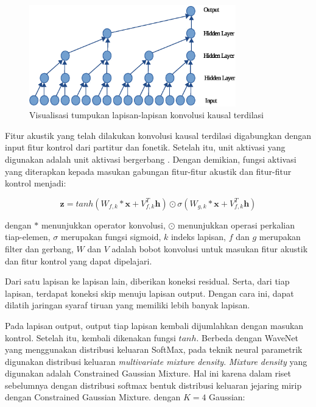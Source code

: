 \begin{figure}[h]
    \centering
    \includegraphics[width=0.8\textwidth]{resources/dilated-cnn.eps}
    \caption{Visualisasi tumpukan lapisan-lapisan konvolusi kausal terdilasi \parencite{Oord2016WaveNetAG}}\label{fig-dilated-cnn}
\end{figure}

Fitur akustik yang telah dilakukan konvolusi kausal terdilasi digabungkan dengan input fitur kontrol dari partitur dan fonetik. Setelah itu, unit aktivasi yang digunakan adalah unit aktivasi bergerbang \parencite{Oord2016ConditionalIG}. Dengan demikian, fungsi aktivasi yang diterapkan kepada masukan gabungan fitur-fitur akustik dan fitur-fitur kontrol menjadi:

\begin{equation}
    \mathbf{z} = tanh(W_{f,k}*\mathbf{x}+V^T_{f,k}\mathbf{h})\odot\sigma(W_{g,k}*\mathbf{x}+V^T_{f,k}\mathbf{h})
\end{equation}\label{eq-gated-activation}

dengan $*$ menunjukkan operator konvolusi, $\odot$ menunjukkan operasi perkalian tiap-elemen, $\sigma$ merupakan fungsi sigmoid, $k$ indeks lapisan, $f$ dan $g$ merupakan filter dan gerbang, $W$ dan $V$ adalah bobot konvolusi untuk masukan fitur akustik dan fitur kontrol yang dapat dipelajari.

Dari satu lapisan ke lapisan lain, diberikan koneksi residual. Serta, dari tiap lapisan, terdapat koneksi skip menuju lapisan output. Dengan cara ini, dapat dilatih jaringan syaraf tiruan yang memiliki lebih banyak lapisan. \parencite{He2016DeepRL}

Pada lapisan output, output tiap lapisan kembali dijumlahkan dengan masukan kontrol. Setelah itu, kembali dikenakan fungsi $tanh$\parencite{bonada2017singing}. Berbeda dengan WaveNet \parencite{Oord2016WaveNetAG} yang menggunakan distribusi keluaran SoftMax, pada teknik neural parametrik digunakan distribusi keluaran \textit{multivariate mixture density}. \textit{Mixture density} yang digunakan adalah Constrained Gaussian Mixture. Hal ini karena dalam riset sebelumnya dengan distribusi softmax bentuk distribusi keluaran jejaring mirip dengan Constrained Gaussian Mixture. dengan $K=4$ Gaussian: \parencite{bonada2017singing}

